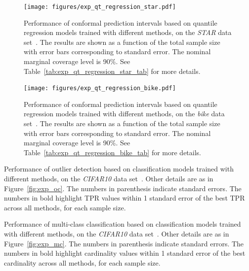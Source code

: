 \begin{figure}[!htb]
    \centering
    \texttt{[image: figures/exp\_qt\_regression\_star.pdf]}
    \caption{\color{blue} Performance of conformal prediction intervals based on quantile regression models trained with different methods, on the {\em STAR} data set~\cite{star}. The results are shown as a function of the total sample size with error bars corresponding to standard error. The nominal marginal coverage level is 90\%. See Table~\ref{tab:exp_qt_regression_star_tab} for more details.}
    \label{fig:exp_qt_regression_star}
\end{figure}

\begin{figure}[!htb]
    \centering
    \texttt{[image: figures/exp\_qt\_regression\_bike.pdf]}
    \caption{\color{blue} Performance of conformal prediction intervals based on quantile regression models trained with different methods, on the {\em bike} data set~\cite{data-bike}. The results are shown as a function of the total sample size with error bars corresponding to standard error. The nominal marginal coverage level is 90\%. See Table~\ref{tab:exp_qt_regression_bike_tab} for more details.}
    \label{fig:exp_qt_regression_bike}
\end{figure}



\begin{table}[!htb]
\centering
    \caption{Performance of outlier detection based on classification models trained with different methods, on the {\em CIFAR10} data set~\cite{cifar10}. Other details are as in Figure~\ref{fig:exp_oc}. The numbers in parenthesis indicate standard errors. The numbers in bold highlight TPR values within 1 standard error of the best TPR across all methods, for each sample size.}
  \label{tab:exp_oc}
  
\end{table}

\begin{table}[!htb]
\centering
    \caption{Performance of multi-class classification based on classification models trained with different methods, on the {\em CIFAR10} data set~\cite{cifar10}. Other details are as in Figure~\ref{fig:exp_mc}. The numbers in parenthesis indicate standard errors. The numbers in bold highlight cardinality values within 1 standard error of the best cardinality across all methods, for each sample size.}
  \label{tab:exp_mc}
  
\end{table}


